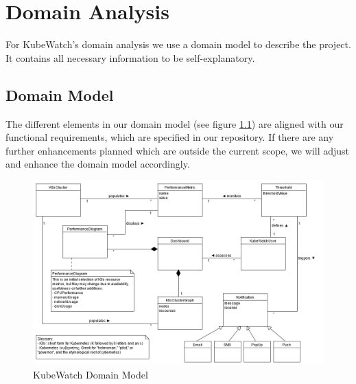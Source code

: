 \chapter{Domain Analysis}


For KubeWatch's domain analysis we use a domain model to describe the project. It contains all necessary information to be self-explanatory.

\section{Domain Model}
The different elements in our domain model (see figure \ref{fig:domain-model}) are aligned with our functional requirements, which are specified in our repository. If there are any further enhancements planned which are outside the current scope, we will adjust and enhance the domain model accordingly.

\vspace{1cm}

\begin{figure}[h]
    \centering
    \caption{KubeWatch Domain Model}
    \label{fig:domain-model}
    \includegraphics[width=\textwidth]{resources/domain_model.png}
\end{figure}